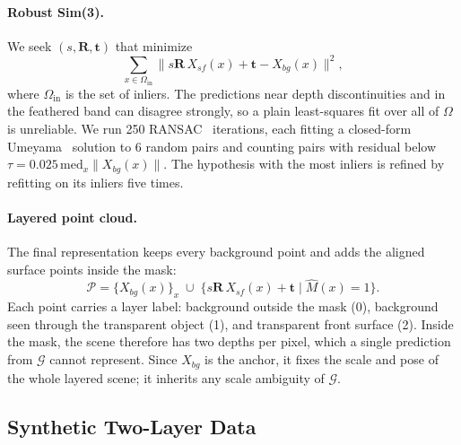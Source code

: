 \paragraph{Robust Sim(3).}
We seek $(s, \mathbf{R}, \mathbf{t})$ that minimize
\begin{equation}
  \sum_{x \in \Omega_{\mathrm{in}}} \big\| s\mathbf{R}\,X_{sf}(x) + \mathbf{t} - X_{bg}(x) \big\|^2 ,
  \label{eq:sim3}
\end{equation}
where $\Omega_{\mathrm{in}}$ is the set of inliers.
The predictions near depth discontinuities and in the feathered band can disagree strongly, so a plain least-squares fit over all of $\Omega$ is unreliable.
We run 250 RANSAC~\cite{ransac} iterations, each fitting a closed-form Umeyama~\cite{umeyama} solution to 6 random pairs and counting pairs with residual below $\tau = 0.025\,\mathrm{med}_{x}\|X_{bg}(x)\|$.
The hypothesis with the most inliers is refined by refitting on its inliers five times.

\paragraph{Layered point cloud.}
The final representation keeps every background point and adds the aligned surface points inside the mask:
\begin{equation}
  \mathcal{P} = \big\{X_{bg}(x)\big\}_{x} \;\cup\; \big\{s\mathbf{R}\,X_{sf}(x) + \mathbf{t} \;\big|\; \hat M(x) = 1\big\}.
  \label{eq:fusion}
\end{equation}
Each point carries a layer label: background outside the mask (0), background seen through the transparent object (1), and transparent front surface (2).
Inside the mask, the scene therefore has two depths per pixel, which a single prediction from $\mathcal{G}$ cannot represent.
Since $X_{bg}$ is the anchor, it fixes the scale and pose of the whole layered scene; it inherits any scale ambiguity of $\mathcal{G}$.

\subsection{Synthetic Two-Layer Data}
\label{sec:data}

